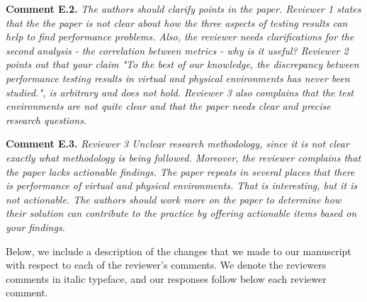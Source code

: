 \documentclass[8pt]{letter} %
\begin{document}
\begin{letter}{}
	{\bf Comment E.2.}
\emph{The authors should clarify points in the paper. Reviewer 1 states that the the paper is not clear about how the three aspects of testing results can help to find performance problems. Also, the reviewer needs clarifications for the second analysis - the correlation between metrics - why is it useful? Reviewer 2 points out that your claim "To the best of our knowledge, the discrepancy between performance testing results in virtual and physical environments has never been studied.", is arbitrary and does not hold. Reviewer 3 also complains that the test environments are not quite clear and that the paper needs clear and precise research questions.}


	
{\bf Comment E.3.}		
\emph{Reviewer 3 Unclear research methodology, since it is not clear exactly what methodology is being followed. Moreover, the reviewer complains that the paper lacks actionable findings. The paper repeats in several places that there is performance of virtual and physical environments. That is interesting, but it is not actionable. The authors should work more on the paper to determine how their solution can contribute to the practice by offering actionable items based on your findings.}

	
	
	
	
Below, we include a description of the changes that we made to our manuscript with respect to each of the reviewer's comments. We denote the reviewers comments in italic typeface, and our responses follow below each reviewer comment.




\end{letter}
\end{document}

